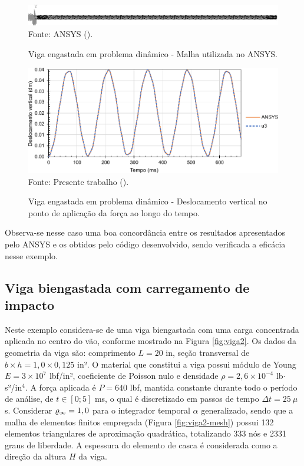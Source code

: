 \begin{figure}[h!]
    \centering
    \caption{Viga engastada em problema dinâmico - Malha utilizada no ANSYS.}
    \includegraphics[width=\linewidth]{Figuras/vigas/ANSYSmesh1.png}
    \\Fonte: ANSYS (\the\year).
    \label{fig:beamANSYS1}
\end{figure}

\begin{figure}[h!]
    \centering
    \caption{Viga engastada em problema dinâmico - Deslocamento vertical no ponto de aplicação da força ao longo do tempo.}
    \includegraphics[width=.8\linewidth]{Figuras/vigas/res1.pdf}
    \\Fonte: Presente trabalho (\the\year).
    \label{fig:res-viga1}
\end{figure}

Observa-se nesse caso uma boa concordância entre os resultados apresentados pelo ANSYS e os obtidos pelo código desenvolvido, sendo verificada a eficácia nesse exemplo.

\subsection{Viga biengastada com carregamento de impacto} \label{Ap:DinBeam2}

Neste exemplo considera-se de uma viga biengastada com uma carga concentrada aplicada no centro do vão, conforme mostrado na Figura \ref{fig:viga2}. Os dados da geometria da viga são: comprimento $L=20$ in, seção transversal de $b\times h=1,0\times0,125$ in². O material que constitui a viga possui módulo de Young $E=3\times10^{7}$ lbf/in², coeficiente de Poisson nulo e densidade $\rho=2,6\times10^{-4}$ lb$\cdot$s²/in$^4$. A força aplicada é $P=640$ lbf, mantida constante durante todo o período de análise, de $t\in[0;5]$ ms, o qual é discretizado em passos de tempo $\Delta t=25\ \mu$s. Considerar $\varrho_\infty=1,0$ para o integrador temporal $\alpha$ generalizado, sendo que a malha de elementos finitos empregada (Figura \ref{fig:viga2-mesh}) possui 132 elementos triangulares de aproximação quadrática, totalizando 333 nós e 2331 graus de liberdade. A espessura do elemento de casca é considerada como a direção da altura $H$ da viga.

